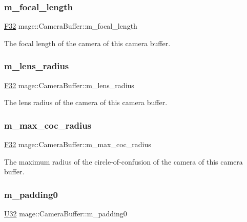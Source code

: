 \subsubsection{\texorpdfstring{m\+\_\+focal\+\_\+length}{m\_focal\_length}}
{\footnotesize\ttfamily \hyperlink{namespacemage_aa97e833b45f06d60a0a9c4fc22ae02c0}{F32} mage\+::\+Camera\+Buffer\+::m\+\_\+focal\+\_\+length}

The focal length of the camera of this camera buffer. \hypertarget{structmage_1_1_camera_buffer_ac3b147c3f8971a8b06bfcb3bd971179c}{}\label{structmage_1_1_camera_buffer_ac3b147c3f8971a8b06bfcb3bd971179c} 
\subsubsection{\texorpdfstring{m\+\_\+lens\+\_\+radius}{m\_lens\_radius}}
{\footnotesize\ttfamily \hyperlink{namespacemage_aa97e833b45f06d60a0a9c4fc22ae02c0}{F32} mage\+::\+Camera\+Buffer\+::m\+\_\+lens\+\_\+radius}

The lens radius of the camera of this camera buffer. \hypertarget{structmage_1_1_camera_buffer_a324324132e7cd8d0d0259a47d0305430}{}\label{structmage_1_1_camera_buffer_a324324132e7cd8d0d0259a47d0305430} 
\subsubsection{\texorpdfstring{m\+\_\+max\+\_\+coc\+\_\+radius}{m\_max\_coc\_radius}}
{\footnotesize\ttfamily \hyperlink{namespacemage_aa97e833b45f06d60a0a9c4fc22ae02c0}{F32} mage\+::\+Camera\+Buffer\+::m\+\_\+max\+\_\+coc\+\_\+radius}

The maximum radius of the circle-\/of-\/confusion of the camera of this camera buffer. \hypertarget{structmage_1_1_camera_buffer_a56019b41362cd7ddb5d747ed4705d854}{}\label{structmage_1_1_camera_buffer_a56019b41362cd7ddb5d747ed4705d854} 
\subsubsection{\texorpdfstring{m\+\_\+padding0}{m\_padding0}}
{\footnotesize\ttfamily \hyperlink{namespacemage_a41c104c036fba3756a74e19f793eeaa1}{U32} mage\+::\+Camera\+Buffer\+::m\+\_\+padding0}


